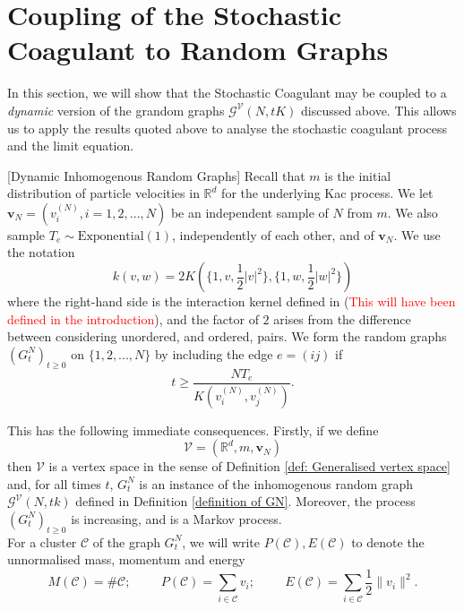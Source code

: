 \section{Coupling of the Stochastic Coagulant to Random Graphs} \label{sec: coupling_to_random_graph}
In this section, we will show that the Stochastic Coagulant may be coupled to a \emph{dynamic} version of the grandom graphs $\mathcal{G}^\mathcal{V}(N,tK)$ discussed above. This allows us to apply the results quoted above to analyse the stochastic coagulant process and the limit equation.
\begin{definition}\label{def: GNT}[Dynamic Inhomogenous Random Graphs] Recall that $m$ is the initial distribution of particle velocities in $\mathbb{R}^d$ for the underlying Kac process. We let $\mathbf{v}_N=(v^{(N)}_i, i=1,2,...,N)$ be an independent sample of $N$ from $m$. We also sample $T_e \sim \text{Exponential}(1)$, independently of each other, and of $\mathbf{v}_N$. We use the notation \begin{equation} k(v,w)=2K\left(\{1,v, \frac{1}{2}|v|^2\},\{1,w, \frac{1}{2}|w|^2\}\right) \end{equation} where the right-hand side is the interaction kernel defined in (\textcolor{red}{This will have been defined in the introduction}), and the factor of $2$ arises from the difference between considering unordered, and ordered, pairs. We form the random graphs $(G^N_t)_{t \ge 0}$ on $\{1,2,...,N\}$ by including the edge $e=(ij)$ if \begin{equation}
    t\ge \frac{N T_e}{K\left(v^{(N)}_i,v^{(N)}_j\right)}.
\end{equation}  \end{definition} This has the following immediate consequences. Firstly, if we define \begin{equation} \mathcal{V}=(\mathbb{R}^d, m, \mathbf{v}_N)\end{equation} then $\mathcal{V}$ is a vertex space in the sense of Definition \ref{def: Generalised vertex space} and, for all times $t$, $G^N_t$ is an instance of the inhomogenous random graph $\mathcal{G}^{\mathcal{V}}(N, tk)$ defined in Definition \ref{definition of GN}. Moreover, the process $(G^N_t)_{t\ge 0}$ is increasing, and is a Markov process. \medskip \\ For a cluster $\mathcal{C}$ of the graph $G^N_t$, we will write $P(\mathcal{C}), E(\mathcal{C})$ to denote the unnormalised mass, momentum and energy \begin{equation}
   M(\mathcal{C})=\#\mathcal{C}; \hspace{1cm} P(\mathcal{C})=\sum_{i\in \mathcal{C}} v_i;\hspace{1cm} E(\mathcal{C})=\sum_{i\in \mathcal{C}} \frac{1}{2}\|v_i\|^2.

\end{equation}
